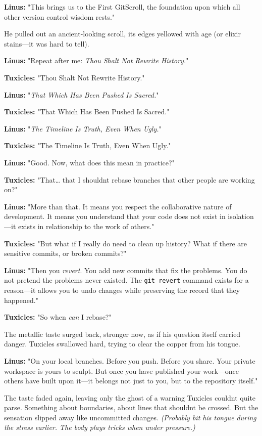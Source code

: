 \textbf{Linus:} "This brings us to the First GitScroll, the foundation upon which all other version control wisdom rests."

He pulled out an ancient-looking scroll, its edges yellowed with age (or elixir stains---it was hard to tell).

\textbf{Linus:} "Repeat after me: \emph{Thou Shalt Not Rewrite History.}"

\textbf{Tuxicles:} "Thou Shalt Not Rewrite History."

\textbf{Linus:} "\emph{That Which Has Been Pushed Is Sacred.}"

\textbf{Tuxicles:} "That Which Has Been Pushed Is Sacred."

\textbf{Linus:} "\emph{The Timeline Is Truth, Even When Ugly.}"

\textbf{Tuxicles:} "The Timeline Is Truth, Even When Ugly."

\textbf{Linus:} "Good. Now, what does this mean in practice?"

\textbf{Tuxicles:} "That\ldots{} that I shouldn\textquotesingle t rebase branches that other people are working on?"

\textbf{Linus:} "More than that. It means you respect the collaborative nature of development. It means you understand that your code does not exist in isolation---it exists in relationship to the work of others."

\textbf{Tuxicles:} "But what if I really do need to clean up history? What if there are sensitive commits, or broken commits?"

\textbf{Linus:} "Then you \emph{revert}. You add new commits that fix the problems. You do not pretend the problems never existed. The \texttt{git\ revert} command exists for a reason---it allows you to undo changes while preserving the record that they happened."

\textbf{Tuxicles:} "So when \emph{can} I rebase?"

The metallic taste surged back, stronger now, as if his question itself carried danger. Tuxicles swallowed hard, trying to clear the copper from his tongue.

\textbf{Linus:} "On your local branches. Before you push. Before you share. Your private workspace is yours to sculpt. But once you have published your work---once others have built upon it---it belongs not just to you, but to the repository itself."

The taste faded again, leaving only the ghost of a warning Tuxicles couldn\textquotesingle t quite parse. Something about boundaries, about lines that shouldn\textquotesingle t be crossed. But the sensation slipped away like uncommitted changes. \emph{(Probably bit his tongue during the stress earlier. The body plays tricks when under pressure.)}

